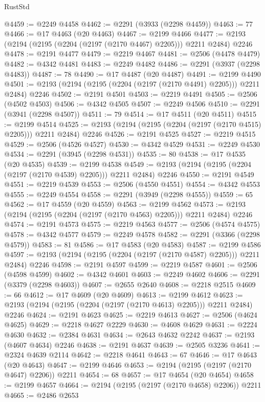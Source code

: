 \begin{lexlean}{RustStd}
\begin{coremodule}
{\begin{coremodule}
{{{{{{{{{{{{{{{{{{{{{{{{{{@4459 := @2249 @4458
@4462 := @2291 (@3933 (@2298 @4459))
@4463 := 77
@4466 := @17 @4463 (@20 @4463)
@4467 := @2199 @4466
@4477 := @2193 (@2194 (@2195 (@2204 (@2197 (@2170 @4467) @2205))) @2211 @2484) @2246
@4478 := @2191 @4477
@4479 := @2219 @4467
@4481 := @2506 (@4478 @4479)
@4482 := @4342 @4481
@4483 := @2249 @4482
@4486 := @2291 (@3937 (@2298 @4483))
@4487 := 78
@4490 := @17 @4487 (@20 @4487)
@4491 := @2199 @4490
@4501 := @2193 (@2194 (@2195 (@2204 (@2197 (@2170 @4491) @2205))) @2211 @2484) @2246
@4502 := @2191 @4501
@4503 := @2219 @4491
@4505 := @2506 (@4502 @4503)
@4506 := @4342 @4505
@4507 := @2249 @4506
@4510 := @2291 (@3941 (@2298 @4507))
@4511 := 79
@4514 := @17 @4511 (@20 @4511)
@4515 := @2199 @4514
@4525 := @2193 (@2194 (@2195 (@2204 (@2197 (@2170 @4515) @2205))) @2211 @2484) @2246
@4526 := @2191 @4525
@4527 := @2219 @4515
@4529 := @2506 (@4526 @4527)
@4530 := @4342 @4529
@4531 := @2249 @4530
@4534 := @2291 (@3945 (@2298 @4531))
@4535 := 80
@4538 := @17 @4535 (@20 @4535)
@4539 := @2199 @4538
@4549 := @2193 (@2194 (@2195 (@2204 (@2197 (@2170 @4539) @2205))) @2211 @2484) @2246
@4550 := @2191 @4549
@4551 := @2219 @4539
@4553 := @2506 (@4550 @4551)
@4554 := @4342 @4553
@4555 := @2249 @4554
@4558 := @2291 (@3949 (@2298 @4555))
@4559 := 65
@4562 := @17 @4559 (@20 @4559)
@4563 := @2199 @4562
@4573 := @2193 (@2194 (@2195 (@2204 (@2197 (@2170 @4563) @2205))) @2211 @2484) @2246
@4574 := @2191 @4573
@4575 := @2219 @4563
@4577 := @2506 (@4574 @4575)
@4578 := @4342 @4577
@4579 := @2249 @4578
@4582 := @2291 (@3366 (@2298 @4579))
@4583 := 81
@4586 := @17 @4583 (@20 @4583)
@4587 := @2199 @4586
@4597 := @2193 (@2194 (@2195 (@2204 (@2197 (@2170 @4587) @2205))) @2211 @2484) @2246
@4598 := @2191 @4597
@4599 := @2219 @4587
@4601 := @2506 (@4598 @4599)
@4602 := @4342 @4601
@4603 := @2249 @4602
@4606 := @2291 (@3379 (@2298 @4603))
@4607 := @2655 @2640
@4608 := @2218 @2515
@4609 := 66
@4612 := @17 @4609 (@20 @4609)
@4613 := @2199 @4612
@4623 := @2193 (@2194 (@2195 (@2204 (@2197 (@2170 @4613) @2205))) @2211 @2484) @2246
@4624 := @2191 @4623
@4625 := @2219 @4613
@4627 := @2506 (@4624 @4625)
@4629 := @2218 @4627 @2229
@4630 := @4608 @4629
@4631 := @2224 @4630
@4632 := @2384 @4631
@4634 := @2643 @4632 @2242
@4637 := @2193 (@4607 @4634) @2246
@4638 := @2191 @4637
@4639 := @2505 @3236
@4641 := @2324 @4639 @2114
@4642 := @2218 @4641
@4643 := 67
@4646 := @17 @4643 (@20 @4643)
@4647 := @2199 @4646
@4653 := @2194 (@2195 (@2197 (@2170 @4647) @2206)) @2211
@4654 := 68
@4657 := @17 @4654 (@20 @4654)
@4658 := @2199 @4657
@4664 := @2194 (@2195 (@2197 (@2170 @4658) @2206)) @2211
@4665 := @2486 @2653
}}}}}}}}}}}}}}}}}}}}}}}}}}
\end{coremodule}}
\end{coremodule}
\end{lexlean}

